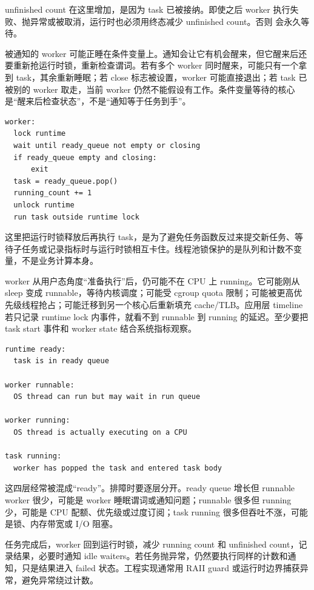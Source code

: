 unfinished count 在这里增加，是因为 task 已被接纳。即使之后 worker 执行失败、抛异常或被取消，运行时也必须用终态减少 unfinished count。否则  会永久等待。

被通知的 worker 可能正睡在条件变量上。通知会让它有机会醒来，但它醒来后还要重新抢运行时锁，重新检查谓词。若有多个 worker 同时醒来，可能只有一个拿到 task，其余重新睡眠；若 close 标志被设置，worker 可能直接退出；若 task 已被别的 worker 取走，当前 worker 仍然不能假设有工作。条件变量等待的核心是“醒来后检查状态”，不是“通知等于任务到手”。

\begin{lstlisting}[numbers=none,caption={worker pop 的状态变化}]
worker:
  lock runtime
  wait until ready_queue not empty or closing
  if ready_queue empty and closing:
      exit
  task = ready_queue.pop()
  running_count += 1
  unlock runtime
  run task outside runtime lock
\end{lstlisting}

这里把运行时锁释放后再执行 task，是为了避免任务函数反过来提交新任务、等待子任务或记录指标时与运行时锁相互卡住。线程池锁保护的是队列和计数不变量，不是业务计算本身。

worker 从用户态角度“准备执行”后，仍可能不在 CPU 上 running。它可能刚从 sleep 变成 runnable，等待内核调度；可能受 cgroup quota 限制；可能被更高优先级线程抢占；可能迁移到另一个核心后重新填充 cache/TLB。应用层 timeline 若只记录 runtime lock 内事件，就看不到 runnable 到 running 的延迟。至少要把 task start 事件和 worker state 结合系统指标观察。

\begin{lstlisting}[numbers=none,caption={ready 到 running 的层次}]
runtime ready:
  task is in ready queue

worker runnable:
  OS thread can run but may wait in run queue

worker running:
  OS thread is actually executing on a CPU

task running:
  worker has popped the task and entered task body
\end{lstlisting}

这四层经常被混成“ready”。排障时要逐层分开。ready queue 增长但 runnable worker 很少，可能是 worker 睡眠谓词或通知问题；runnable 很多但 running 少，可能是 CPU 配额、优先级或过度订阅；task running 很多但吞吐不涨，可能是锁、内存带宽或 I/O 阻塞。

任务完成后，worker 回到运行时锁，减少 running count 和 unfinished count，记录结果，必要时通知 idle waiters。若任务抛异常，仍然要执行同样的计数和通知，只是结果进入 failed 状态。工程实现通常用 RAII guard 或运行时边界捕获异常，避免异常绕过计数。


